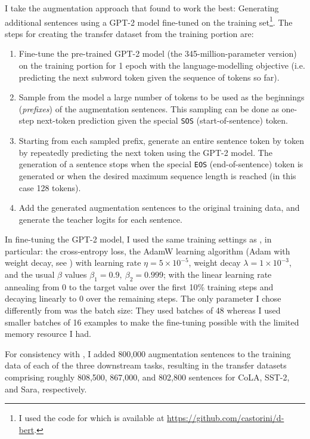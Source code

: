 \documentclass[bsc,frontabs,twoside,singlespacing,parskip,deptreport]{infthesis}
\begin{document}
{{    I take the augmentation approach that \citeauthor{Tang_2019b} found to work the best: Generating additional sentences using a GPT-2 model \citep{Radford_2019} fine-tuned on the training set\footnote{I used the code for \citet{Tang_2019b} which is available at \url{https://github.com/castorini/d-bert}.}. The steps for creating the transfer dataset from the training portion are:
    \begin{enumerate}
      \item Fine-tune the pre-trained GPT-2 model (the 345-million-parameter version) on the training portion for 1 epoch with the language-modelling objective (i.e. predicting the next subword token given the sequence of tokens so far).
      \item Sample from the model a large number of tokens to be used as the beginnings (\textit{prefixes}) of the augmentation sentences. This sampling can be done as one-step next-token prediction given the special \verb|SOS| (start-of-sentence) token.
      \item Starting from each sampled prefix, generate an entire sentence token by token by repeatedly predicting the next token using the GPT-2 model. The generation of a sentence stops when the special \verb|EOS| (end-of-sentence) token is generated or when the desired maximum sequence length is reached (in this case 128 tokens).
      \item Add the generated augmentation sentences to the original training data, and generate the teacher logits for each sentence.
    \end{enumerate}

    In fine-tuning the GPT-2 model, I used the same training settings as \citeauthor{Tang_2019b}, in particular: the cross-entropy loss, the AdamW learning algorithm (Adam with weight decay, see \citet{Loshchilov_2019}) with learning rate $\eta=5\times10^{-5}$, weight decay $\lambda=1\times10^{-3}$, and the usual $\beta$ values $\beta_1=0.9,\ \beta_2=0.999$; with the linear learning rate annealing from 0 to the target value over the first 10\% training steps and decaying linearly to 0 over the remaining steps. The only parameter I chose differently from \citeauthor{Tang_2019b} was the batch size: They used batches of 48 whereas I used smaller batches of 16 examples to make the fine-tuning possible with the limited memory resource I had.

    For consistency with \citet{Tang_2019b}, I added 800,000 augmentation sentences to the training data of each of the three downstream tasks, resulting in the transfer datasets comprising roughly 808,500, 867,000, and 802,800 sentences for CoLA, SST-2, and Sara, respectively.
  }

}
\end{document}
